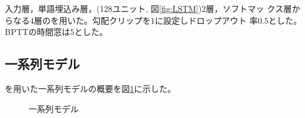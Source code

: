 \documentclass[twocolumn]{jarticle}
\begin{document}
入力層，単語埋込み層，\LSTM(128ユニット, 図\ref{fig:LSTM})$2$層，ソフトマッ
クス層からなる$4$層の\NN を用いた。勾配クリップを$1$に設定しドロップアウト
率$0.5$とした。BPTTの時間窓は$5$とした。

\subsection{一系列モデル}
\LSTM を用いた一系列モデルの概要を図\ref{fig:serial_model}に示した。
\begin{figure}[H]
\centering
{}
\caption{一系列モデル}\label{fig:serial_model}
\end{figure}
\end{document}

